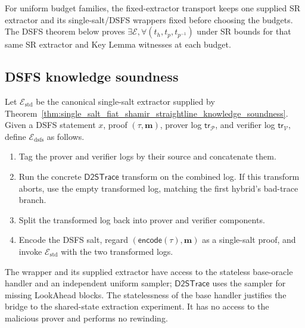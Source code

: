 For uniform budget families, the fixed-extractor transport keeps one supplied SR extractor
and its single-salt/DSFS wrappers fixed before choosing the budgets. The DSFS theorem below proves
$\exists\mathcal E,\forall(t_h,t_p,t_{p^{-1}})$ under SR bounds for that same SR extractor
and Key Lemma witnesses at each budget.

\subsection{DSFS knowledge soundness}

\begin{definition}
  \label{def:dsfs_straightline_extractor}
  Let $\mathcal E_{\mathrm{std}}$ be the canonical single-salt extractor supplied by
  Theorem~\ref{thm:single_salt_fiat_shamir_straightline_knowledge_soundness}.  Given a DSFS
  statement $x$, proof $(\tau,\mathbf m)$, prover log $\mathsf{tr}_{\mathcal P}$, and verifier log
  $\mathsf{tr}_{\mathcal V}$, define $\mathcal E_{\mathrm{dsfs}}$ as follows.
  \begin{enumerate}
    \item Tag the prover and verifier logs by their source and concatenate them.
    \item Run the concrete $\mathsf{D2STrace}$ transform on the combined log.  If this transform
      aborts, use the empty transformed log, matching the first hybrid's bad-trace branch.
    \item Split the transformed log back into prover and verifier components.
    \item Encode the DSFS salt, regard $(\mathsf{encode}(\tau),\mathbf m)$ as a single-salt proof,
      and invoke $\mathcal E_{\mathrm{std}}$ with the two transformed logs.
  \end{enumerate}
  The wrapper and its supplied extractor have access to the stateless base-oracle handler
  and an independent uniform sampler; $\mathsf{D2STrace}$ uses the sampler for missing
  LookAhead blocks. The statelessness of the base handler justifies the bridge to the
  shared-state extraction experiment.
  It has no access to the malicious prover and performs no rewinding.
  \leanok
\end{definition}

